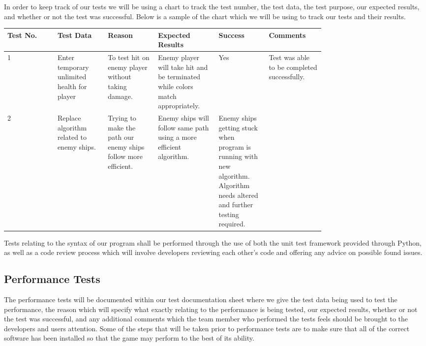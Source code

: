 %
In order to keep track of our tests we will be using a chart to
track the test number, the test data, the test purpose, our expected
results, and whether or not the test was successful. Below is a
sample of the chart which we will be using to track our tests and
their results.

\begin{center}
    \begin{tabular}{| p{0.125\linewidth} | p{0.125\linewidth} | p{0.125\linewidth} |
                      p{0.125\linewidth} | p{0.125\linewidth} | p{0.125\linewidth} |}
    \hline
          Test No.
        & Test Data
        & Reason
        & Expected Results
        & Success
        & Comments \\
    \hline
          1
        & Enter temporary unlimited health for player
        & To test hit on enemy player without taking damage.
        & Enemy player will take hit and be terminated while colors match appropriately.
        & Yes
        & Test was able to be completed successfully.  \\
    \hline
          2
        & Replace algorithm related to enemy ships.
        & Trying to make the path our enemy ships follow more efficient.
        & Enemy ships will follow same path using a more efficient algorithm.
        & Enemy ships getting stuck when program is running with new
          algorithm. Algorithm needs altered and further testing required.
        & \\
    \hline
    \end{tabular}
\end{center}


Tests relating to the syntax of our program shall be performed
through the use of both the unit test framework provided through
Python, as well as a code review process which will involve
developers reviewing each other’s code and offering any advice on
possible found issues.

\subsection*{Performance Tests}
    The performance tests will be documented within our test
    documentation sheet where we give the test data being used to
    test the performance, the reason which will specify what exactly
    relating to the performance is being tested, our expected
    results, whether or not the test was successful, and any
    additional comments which the team member who performed the
    tests feels should be brought to the developers and users
    attention.  Some of the steps that will be taken prior to
    performance tests are to make sure that all of the correct
    software has been installed so that the game may perform to the
    best of its ability.

